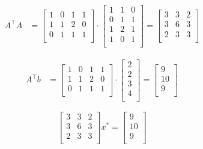 \documentclass[unicode,11pt,a4paper,oneside,numbers=endperiod,openany]{scrartcl}
\begin{document}
\subsection{}
\begin{equation*}
    \begin{aligned}
        A^{\top}A &
        =
        \begin{bmatrix} 1 & 0 & 1 & 1 \\ 1 & 1 & 2 & 0 \\ 0 & 1 & 1 & 1 \\ \end{bmatrix}
        \cdot
        \begin{bmatrix} 1 & 1 & 0 \\0 & 1 & 1 \\1 & 2 & 1 \\1 & 0 & 1 \\ \end{bmatrix}
        =
        \begin{bmatrix} 3 & 3 & 2 \\ 3 & 6 & 3 \\ 2 & 3 & 3 \\ \end{bmatrix}
    \end{aligned}
\end{equation*}

\begin{equation*}
    \begin{aligned}
        A^{\top}b &
        =
        \begin{bmatrix} 1 & 0 & 1 & 1 \\ 1 & 1 & 2 & 0 \\ 0 & 1 & 1 & 1 \\ \end{bmatrix}
        \cdot
        \begin{bmatrix} 2 \\ 2 \\ 3 \\ 4 \\ \end{bmatrix}
        =
        \begin{bmatrix} 9 \\ 10 \\ 9 \\ \end{bmatrix}
    \end{aligned}
\end{equation*}

\[
    \begin{bmatrix} 3 & 3 & 2 \\ 3 & 6 & 3 \\ 2 & 3 & 3 \\ \end{bmatrix}
    x^*
    =
    \begin{bmatrix} 9 \\ 10 \\ 9 \\ \end{bmatrix}
\]
\end{document}
